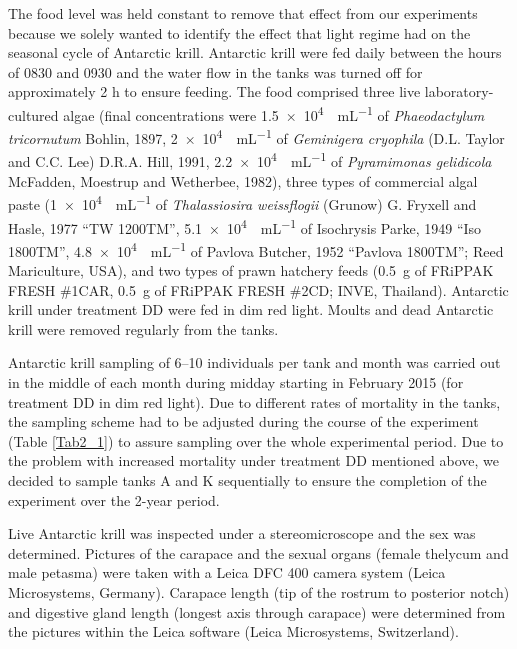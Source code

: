 The food level was held constant to remove that effect from our experiments
because we solely wanted to identify the effect that light regime had on the
seasonal cycle of Antarctic krill. Antarctic krill were fed daily between the
hours of 0830 and 0930 and the water flow in the tanks was turned off for
approximately 2 h to ensure feeding. The food comprised three live
laboratory-cultured algae (final concentrations were
\SI{1.5e4}{\cells\per\milli\liter} of \textit{Phaeodactylum tricornutum}
Bohlin, 1897, \SI{2e4}{\cells\per\milli\liter} of \textit{Geminigera cryophila}
(D.L. Taylor and C.C.  Lee) D.R.A. Hill, 1991,
\SI{2.2e4}{\cells\per\milli\liter} of \textit{Pyramimonas gelidicola} McFadden,
Moestrup and Wetherbee, 1982), three types of commercial algal paste
(\SI{1e4}{\cells\per\milli\liter} of \textit{Thalassiosira weissflogii}
(Grunow) G. Fryxell and Hasle, 1977 “TW 1200TM”,
\SI{5.1e4}{\cells\per\milli\liter} of Isochrysis Parke, 1949 “Iso 1800TM”,
\SI{4.8e4}{\cells\per\milli\liter} of Pavlova Butcher, 1952 “Pavlova 1800TM”;
Reed Mariculture, USA), and two types of prawn hatchery feeds (\SI{0.5}{\gram}
of FRiPPAK FRESH \#1CAR, \SI{0.5}{\gram} of FRiPPAK FRESH \#2CD; INVE,
Thailand).  Antarctic krill under treatment DD were fed in dim red light.
Moults and dead Antarctic krill were removed regularly from the tanks. 

Antarctic krill sampling of 6–10 individuals per tank and month was carried out
in the middle of each month during midday starting in February 2015 (for
treatment DD in dim red light). Due to different rates of mortality in the
tanks, the sampling scheme had to be adjusted during the course of the
experiment (Table \ref{Tab2_1}) to assure sampling over the whole experimental
period. Due to the problem with increased mortality under treatment DD
mentioned above, we decided to sample tanks A and K sequentially to ensure the
completion of the experiment over the 2-year period. 



Live Antarctic krill was inspected under a stereomicroscope and the sex was
determined. Pictures of the carapace and the sexual organs (female thelycum and
male petasma) were taken with a Leica DFC 400 camera system (Leica
Microsystems, Germany). Carapace length (tip of the rostrum to posterior notch)
and digestive gland length (longest axis through carapace) were determined from
the pictures within the Leica  software 
(Leica Microsystems, Switzerland). 

